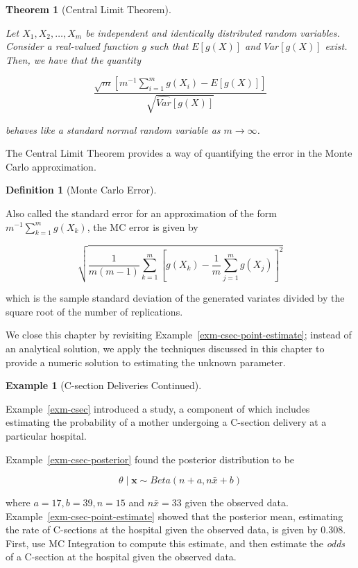 \documentclass[
  letterpaper,
  DIV=11,
  numbers=noendperiod]{scrreprt}
\theoremstyle{definition}
\newtheorem{example}{Example}[chapter]
\theoremstyle{definition}
\newtheorem{definition}{Definition}[chapter]
\theoremstyle{plain}
\newtheorem{theorem}{Theorem}[chapter]
\theoremstyle{remark}
\begin{document}
\begin{theorem}[Central Limit
Theorem]\protect\hypertarget{thm-clt}{}\label{thm-clt}

Let \(X_1, X_2, \dotsc, X_m\) be independent and identically distributed
random variables. Consider a real-valued function \(g\) such that
\(E\left[g(X)\right]\) and \(Var\left[g(X)\right]\) exist. Then, we have
that the quantity

\[\frac{\sqrt{m} \left[m^{-1} \sum_{i=1}^{m} g\left(X_i\right) - E\left[g(X)\right]\right]}{\sqrt{\widehat{Var}\left[g(X)\right]}}\]

behaves like a standard normal random variable as
\(m \rightarrow \infty\).

\end{theorem}

The Central Limit Theorem provides a way of quantifying the error in the
Monte Carlo approximation.

\begin{definition}[Monte Carlo
Error]\protect\hypertarget{def-mc-error}{}\label{def-mc-error}

Also called the standard error for an approximation of the form
\(m^{-1} \sum\limits_{k=1}^{m} g\left(X_k\right)\), the MC error is
given by

\[\sqrt{\frac{1}{m(m-1)} \sum_{k=1}^{m} \left[g\left(X_k\right) - \frac{1}{m} \sum_{j=1}^{m} g\left(X_j\right)\right]^2}\]

which is the sample standard deviation of the generated variates divided
by the square root of the number of replications.

\end{definition}

We close this chapter by revisiting
Example~\ref{exm-csec-point-estimate}; instead of an analytical
solution, we apply the techniques discussed in this chapter to provide a
numeric solution to estimating the unknown parameter.

\begin{example}[C-section Deliveries
Continued]\protect\hypertarget{exm-csec-mc-integration}{}\label{exm-csec-mc-integration}

Example~\ref{exm-csec} introduced a study, a component of which includes
estimating the probability of a mother undergoing a C-section delivery
at a particular hospital.

Example~\ref{exm-csec-posterior} found the posterior distribution to be

\[\theta \mid \mathbf{x} \sim Beta\left(n + a, n\bar{x} + b\right)\]

where \(a = 17, b = 39, n = 15\) and \(n\bar{x} = 33\) given the
observed data.\\
Example~\ref{exm-csec-point-estimate} showed that the posterior mean,
estimating the rate of C-sections at the hospital given the observed
data, is given by 0.308. First, use MC Integration to compute this
estimate, and then estimate the \emph{odds} of a C-section at the
hospital given the observed data.

\end{example}
\end{document}
